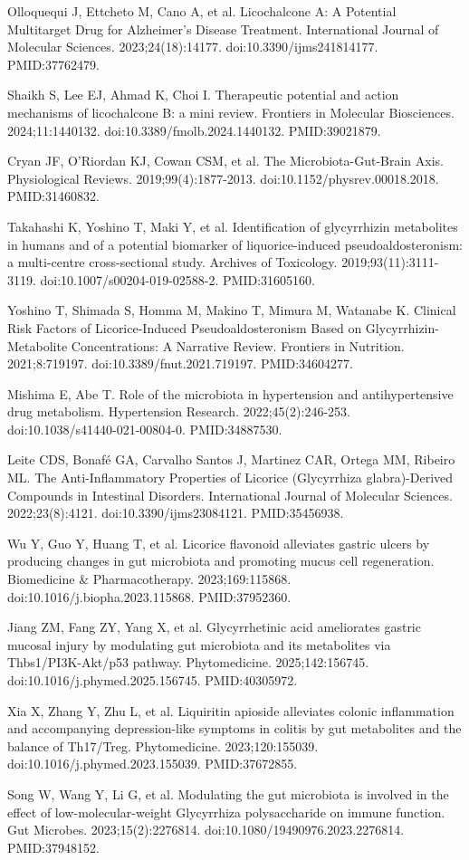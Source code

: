\documentclass[11pt,oneside]{book}
\newcommand{\reff}[2]{\par\hangindent=7mm\hangafter=1\noindent[#1]\hspace{2mm}#2\par}
\begin{document}
\reff{11}{Olloquequi J, Ettcheto M, Cano A, et al. Licochalcone A: A Potential Multitarget Drug for Alzheimer's Disease Treatment. International Journal of Molecular Sciences. 2023;24(18):14177. doi:10.3390/ijms241814177. PMID:37762479.}
\reff{12}{Shaikh S, Lee EJ, Ahmad K, Choi I. Therapeutic potential and action mechanisms of licochalcone B: a mini review. Frontiers in Molecular Biosciences. 2024;11:1440132. doi:10.3389/fmolb.2024.1440132. PMID:39021879.}
\reff{13}{Cryan JF, O'Riordan KJ, Cowan CSM, et al. The Microbiota-Gut-Brain Axis. Physiological Reviews. 2019;99(4):1877-2013. doi:10.1152/physrev.00018.2018. PMID:31460832.}
\reff{14}{Takahashi K, Yoshino T, Maki Y, et al. Identification of glycyrrhizin metabolites in humans and of a potential biomarker of liquorice-induced pseudoaldosteronism: a multi-centre cross-sectional study. Archives of Toxicology. 2019;93(11):3111-3119. doi:10.1007/s00204-019-02588-2. PMID:31605160.}
\reff{15}{Yoshino T, Shimada S, Homma M, Makino T, Mimura M, Watanabe K. Clinical Risk Factors of Licorice-Induced Pseudoaldosteronism Based on Glycyrrhizin-Metabolite Concentrations: A Narrative Review. Frontiers in Nutrition. 2021;8:719197. doi:10.3389/fnut.2021.719197. PMID:34604277.}
\reff{16}{Mishima E, Abe T. Role of the microbiota in hypertension and antihypertensive drug metabolism. Hypertension Research. 2022;45(2):246-253. doi:10.1038/s41440-021-00804-0. PMID:34887530.}
\reff{17}{Leite CDS, Bonafé GA, Carvalho Santos J, Martinez CAR, Ortega MM, Ribeiro ML. The Anti-Inflammatory Properties of Licorice (Glycyrrhiza glabra)-Derived Compounds in Intestinal Disorders. International Journal of Molecular Sciences. 2022;23(8):4121. doi:10.3390/ijms23084121. PMID:35456938.}
\reff{18}{Wu Y, Guo Y, Huang T, et al. Licorice flavonoid alleviates gastric ulcers by producing changes in gut microbiota and promoting mucus cell regeneration. Biomedicine \& Pharmacotherapy. 2023;169:115868. doi:10.1016/j.biopha.2023.115868. PMID:37952360.}
\reff{19}{Jiang ZM, Fang ZY, Yang X, et al. Glycyrrhetinic acid ameliorates gastric mucosal injury by modulating gut microbiota and its metabolites via Thbs1/PI3K-Akt/p53 pathway. Phytomedicine. 2025;142:156745. doi:10.1016/j.phymed.2025.156745. PMID:40305972.}
\reff{20}{Xia X, Zhang Y, Zhu L, et al. Liquiritin apioside alleviates colonic inflammation and accompanying depression-like symptoms in colitis by gut metabolites and the balance of Th17/Treg. Phytomedicine. 2023;120:155039. doi:10.1016/j.phymed.2023.155039. PMID:37672855.}
\reff{21}{Song W, Wang Y, Li G, et al. Modulating the gut microbiota is involved in the effect of low-molecular-weight Glycyrrhiza polysaccharide on immune function. Gut Microbes. 2023;15(2):2276814. doi:10.1080/19490976.2023.2276814. PMID:37948152.}
\end{document}
